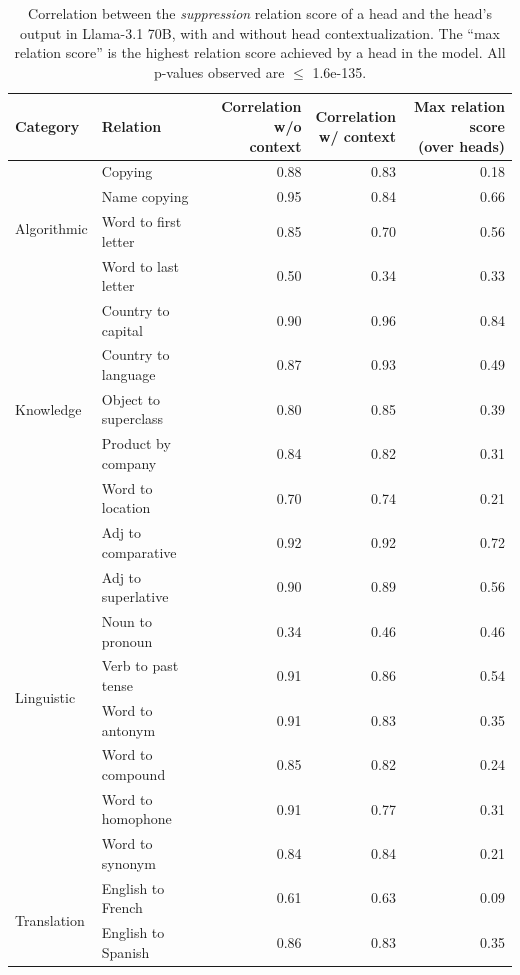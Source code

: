 \documentclass[11pt]{article}
\newcommand{\llamaThreeSeventyB}{Llama-3.1 70B}
\begin{document}
\begin{table}[p]
\centering
\footnotesize

\begin{tabular}{llrrr}
\toprule
Category & Relation & \makecell{Correlation\\w/o context} &  \makecell{Correlation\\w/ context} & \makecell{Max relation score\\(over heads)} \\
\midrule
\multirow{4}{*}{Algorithmic} & Copying & 0.88 &  0.83 &  0.18 \\
 & Name copying & 0.95 &  0.84 &  0.66 \\
 & Word to first letter & 0.85 &  0.70 &  0.56 \\
 & Word to last letter & 0.50 & 0.34 & 0.33 \\
\midrule
\multirow{5}{*}{Knowledge} & Country to capital & 0.90 &  0.96 &  0.84 \\
 & Country to language & 0.87 &  0.93 &  0.49 \\
 & Object to superclass & 0.80 &  0.85 &  0.39 \\
 & Product by company & 0.84 &  0.82 &  0.31 \\
 & Word to location & 0.70 &  0.74 &  0.21 \\
\midrule
\multirow{8}{*}{Linguistic} & Adj to comparative & 0.92 &  0.92 &  0.72 \\
 & Adj to superlative & 0.90 &  0.89 &  0.56 \\
 & Noun to pronoun & 0.34  & 0.46  & 0.46 \\
 & Verb to past tense & 0.91 &  0.86 &  0.54 \\
 & Word to antonym & 0.91 &  0.83 &  0.35 \\
 & Word to compound & 0.85 &  0.82 &  0.24 \\
 & Word to homophone & 0.91 &  0.77 &  0.31 \\
 & Word to synonym & 0.84 &  0.84 &  0.21 \\
\midrule
\multirow{2}{*}{Translation} & English to French & 0.61 &  0.63 &  0.09 \\
 & English to Spanish & 0.86 &  0.83 & 0.35 \\
\bottomrule
\end{tabular}
\caption{Correlation between the \emph{suppression} relation score of a head and the head's output in \llamaThreeSeventyB{}, with and without head contextualization. The ``max relation score'' is the highest relation score achieved by a head in the model. All p-values observed are $\leq$ 1.6e-135.} 
\label{tab:Dynamic_results_llama_70b_supression}
\end{table}
\end{document}
